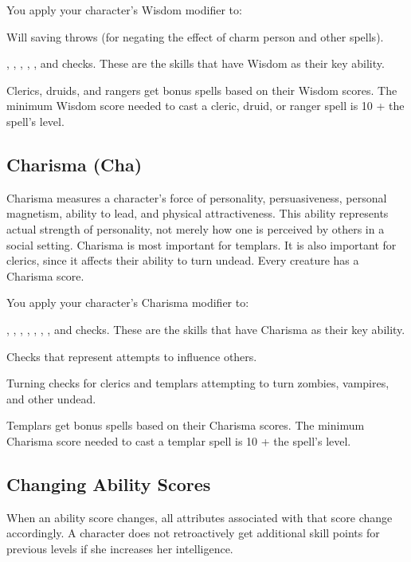 You apply your character's Wisdom modifier to:
\begin{itemize*}
\item Will saving throws (for negating the effect of charm person and other spells).
\item {}, , , , , and  checks. These are the skills that have Wisdom as their key ability.
\item Clerics, druids, and rangers get bonus spells based on their Wisdom scores. The minimum Wisdom score needed to cast a cleric, druid, or ranger spell is 10 + the spell's level.
\end{itemize*}

\subsection{Charisma (Cha)}
Charisma measures a character's force of personality, persuasiveness, personal magnetism, ability to lead, and physical attractiveness. This ability represents actual strength of personality, not merely how one is perceived by others in a social setting. Charisma is most important for templars. It is also important for clerics, since it affects their ability to turn undead. Every creature has a Charisma score.

You apply your character's Charisma modifier to:
\begin{itemize*}
\item {}, , , , , , , and  checks. These are the skills that have Charisma as their key ability.
\item Checks that represent attempts to influence others.
\item Turning checks for clerics and templars attempting to turn zombies, vampires, and other undead.
\end{itemize*}

Templars get bonus spells based on their Charisma scores. The minimum Charisma score needed to cast a templar spell is 10 + the spell's level.

\subsection{Changing Ability Scores}
When an ability score changes, all attributes associated with that score change accordingly. A character does not retroactively get additional skill points for previous levels if she increases her intelligence.
